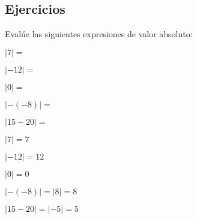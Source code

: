 
\subsection{Ejercicios}

\begin{exercise}
\problem Evalúe las siguientes expresiones de valor absoluto:

\begin{exerciselist}
    \item $|7| = $ \underline{\hspace{3cm}}
    \item $|-12| = $ \underline{\hspace{3cm}}
    \item $|0| = $ \underline{\hspace{3cm}}
    \item $|-(-8)| = $ \underline{\hspace{3cm}}
    \item $|15 - 20| = $ \underline{\hspace{3cm}}
\end{exerciselist}

\begin{solucion}
\begin{exerciselist}
    \item $|7| = 7$
    \item $|-12| = 12$
    \item $|0| = 0$
    \item $|-(-8)| = |8| = 8$
    \item $|15 - 20| = |-5| = 5$
\end{exerciselist}
\end{solucion}
\end{exercise}

